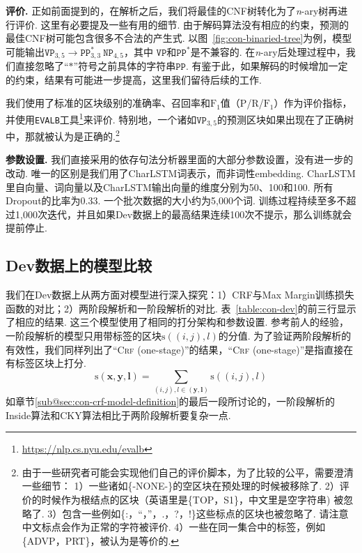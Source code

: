 \noindent\textbf{评价.}
正如前面提到的，在解析之后，我们将最佳的CNF树转化为了\textit{n}-ary树再进行评价.
这里有必要提及一些有用的细节.
由于解码算法没有相应的约束，预测的最佳CNF树可能包含很多不合法的产生式.
以图~\ref{fig:con-binaried-tree}为例，模型可能输出$\texttt{VP}_{3,5} \rightarrow \texttt{PP}^{\ast}_{3,3} ~ \texttt{NP}_{4,5}$，其中 $\texttt{VP}$和$\texttt{PP}^{\ast}$是不兼容的.
在\textit{n}-ary后处理过程中，我们直接忽略了``$\mathtt{\ast}$''符号之前具体的字符串$\texttt{PP}$.
有鉴于此，如果解码的时候增加一定的约束，结果有可能进一步提高，这里我们留待后续的工作.

我们使用了标准的区块级别的准确率、召回率和$\mathrm{F}_1$值（P/R/$\mathrm{F}_1$）作为评价指标，并使用\texttt{EVALB}工具\footnote{\url{https://nlp.cs.nyu.edu/evalb}}来评价.
特别地，一个诸如$\texttt{VP}_{3,5}$的预测区块如果出现在了正确树中，那就被认为是正确的.\footnote{
  由于一些研究者可能会实现他们自己的评价脚本，为了比较的公平，需要澄清一些细节：
  1）一些诸如\{-NONE-\}的空区块在预处理的时候被移除了.
  2）评价的时候作为根结点的区块（英语里是\{TOP，S1\}，中文里是空字符串) 被忽略了.
  3）包含一些例如\{:，``，''，.，?，!\}这些标点的区块也被忽略了. 请注意中文标点会作为正常的字符被评价.
  4）一些在同一集合中的标签，例如\{ADVP，PRT\}，被认为是等价的.}

\noindent\textbf{参数设置.}
我们直接采用\citep{dozat-etal-2017-biaffine}的依存句法分析器里面的大部分参数设置，没有进一步的改动.
唯一的区别是我们用了CharLSTM词表示，而非词性embedding.
CharLSTM里自向量、词向量以及CharLSTM输出向量的维度分别为50、100和100.
所有Dropout的比率为0.33.
一个批次数据的大小约为5,000个词.
训练过程持续至多不超过1,000次迭代，并且如果Dev数据上的最高结果连续100次不提示，那么训练就会提前停止.



\subsection{Dev数据上的模型比较}

我们在Dev数据上从两方面对模型进行深入探究：1）CRF与Max Margin训练损失函数的对比；2）两阶段解析和一阶段解析的对比.
表~\ref{table:con-dev}的前三行显示了相应的结果.
这三个模型使用了相同的打分架构和参数设置.
参考前人的经验\citep{stern-etal-2017-minimal}，一阶段解析的模型只用带标签的区块$\mathrm{s}((i,j),l)$的分值.
为了验证两阶段解析的有效性，我们同样列出了``\textsc{Crf} (one-stage)''的结果，``\textsc{Crf} (one-stage)''是指直接在有标签区块上打分.
\begin{equation} \label{eq:tree-label-score}
  \mathrm{s}(\boldsymbol{x},\boldsymbol{y},\boldsymbol{l}) =
  \sum_{(i,j),l \in (\boldsymbol{y}, \boldsymbol{l})} \mathrm{s}((i,j),l)
\end{equation}
如章节\ref{sub@sec:con-crf-model-definition}的最后一段所讨论的，一阶段解析的Inside算法和CKY算法相比于两阶段解析要复杂一点.

